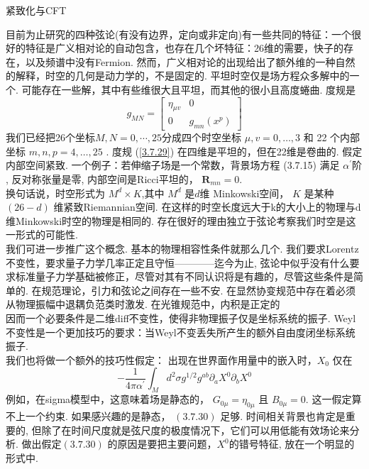 \centerline{\Large 紧致化与CFT}
目前为止研究的四种弦论(有没有边界，定向或非定向)有一些共同的特征：一个很好的特征是广义相对论的自动包含，也存在几个坏特征：26维的需要，快子的存在，以及频谱中没有Fermion. 然而，广义相对论的出现给出了额外维的一种自然的解释，时空的几何是动力学的，不是固定的. 平坦时空仅是场方程众多解中的一个. 可能存在一些解，其中有些维很大且平坦，而其他的很小且高度蜷曲. 度规是
\begin{equation}\label{3.7.29}
g_{M N}=\left[\begin{array}{cc}
\eta_{\mu v} & 0 \\
0 & g_{m n}\left(x^{p}\right)
\end{array}\right]
\end{equation}
我们已经把26个坐标$M,N=0,\cdots,25$分成四个时空坐标 $\mu, v=0, \ldots, 3$ 和 22 个内部坐标 $m, n, p=4, \ldots, 25$ . 度规 (\ref{3.7.29}) 在四维是平坦的，但在22维是卷曲的. 假定内部空间紧致. 一个例子：若伸缩子场是一个常数，背景场方程 (3.7.15) 满足 $\alpha^{\prime}$阶 , 反对称张量是零, 内部空间是Ricci平坦的，  $\boldsymbol{R}_{m n}=0$.\\
换句话说，时空形式为 $M^{d} \times K$,其中 $M^{d}$ 是$d$维 Minkowski空间， $K$ 是某种 $(26-d)$ 维紧致Riemannian空间. 在这样的时空长度远大于k的大小上的物理与d维Minkowski时空的物理是相同的. 存在很好的理由独立于弦论考察我们时空是这一形式的可能性.\\
我们可进一步推广这个概念. 基本的物理相容性条件就那么几个. 我们要求Lorentz不变性，要求量子力学几率正定且守恒————迄今为止, 弦论中似乎没有什么要求标准量子力学基础被修正，尽管对其有不同认识将是有趣的，尽管这些条件是简单的. 在规范理论，引力和弦论之间存在一些不安. 在显然协变规范中存在着必须从物理振幅中退耦负范类时激发. 在光锥规范中，内积是正定的\\
因而一个必要条件是二维diff不变性，使得非物理振子仅是坐标系统的振子. Weyl不变性是一个更加技巧的要求：当Weyl不变丢失所产生的额外自由度闭坐标系统振子.\\
我们也将做一个额外的技巧性假定： 出现在世界面作用量中的嵌入时，$X_0$   仅在
\begin{equation}\label{3.7.30}
-\frac{1}{4 \pi \alpha^{\prime}} \int_{M} d^{2} \sigma g^{1 / 2} g^{a b} \partial_{a} X^{0} \partial_{b} X^{0}
\end{equation}
例如，在sigma模型中，这意味着场是静态的， $G_{0 \mu}=\eta_{0 \mu}$ 且 $B_{0 \mu}=0 $. 这一假定算不上一个约束. 如果感兴趣的是静态， $(3.7 .30)$ 足够. 时间相关背景也肯定是重要的, 但除了在时间尺度就是弦尺度的极度情况下，它们可以用低能有效场论来分析. 做出假定$(3.7 .30)$ 的原因是要把主要问题，$X^0$的错号特征, 放在一个明显的形式中. \\
